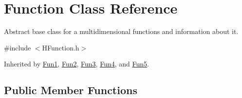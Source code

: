 \hypertarget{class_function}{}\section{Function Class Reference}
\label{class_function}


Abstract base class for a multidimensional functions and information about it.  




{\ttfamily \#include $<$H\+Function.\+h$>$}



Inherited by \hyperlink{class_fun1}{Fun1}, \hyperlink{class_fun2}{Fun2}, \hyperlink{class_fun3}{Fun3}, \hyperlink{class_fun4}{Fun4}, and \hyperlink{class_fun5}{Fun5}.

\subsection*{Public Member Functions}
